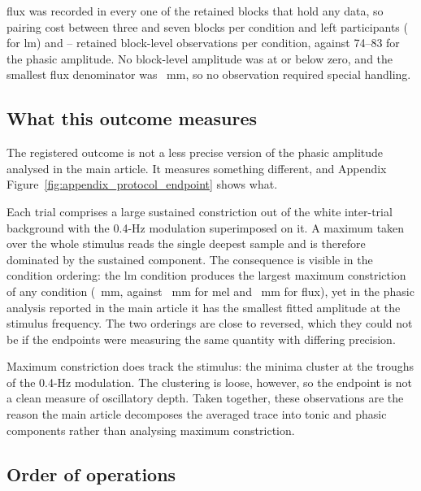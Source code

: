 \begin{appendixbox}
\acs{flux} was recorded in every one of the \ProtocolPlrAllNBlocksAnyData{} retained blocks that hold any data, so pairing cost between three and seven blocks per condition and left \ProtocolPlrAllNParticipantsMax{} participants (\ProtocolPlrAllNParticipantsMin{} for \acs{lm}) and \ProtocolPlrAllNObsMin{}--\ProtocolPlrAllNObsMax{} retained block-level observations per condition, against 74--83 for the phasic amplitude. No block-level amplitude was at or below zero, and the smallest \acs{flux} denominator was \ProtocolPlrAllFluxDenominatorMinMm{}~mm, so no observation required special handling.

\subsection{What this outcome measures}

The registered outcome is not a less precise version of the phasic amplitude analysed in the main article. It measures something different, and Appendix Figure~\ref{fig:appendix_protocol_endpoint} shows what.

Each trial comprises a large sustained constriction out of the white inter-trial background with the 0.4-Hz modulation superimposed on it. A maximum taken over the whole stimulus reads the single deepest sample and is therefore dominated by the sustained component. The consequence is visible in the condition ordering: the \acs{lm} condition produces the largest maximum constriction of any condition (\ProtocolPlrLMEndpointMm{}~mm, against \ProtocolPlrMelEndpointMm{}~mm for \acs{mel} and \ProtocolPlrFluxEndpointMm{}~mm for \acs{flux}), yet in the phasic analysis reported in the main article it has the smallest fitted amplitude at the stimulus frequency. The two orderings are close to reversed, which they could not be if the endpoints were measuring the same quantity with differing precision.

Maximum constriction does track the stimulus: the minima cluster at the troughs of the 0.4-Hz modulation. The clustering is loose, however, so the endpoint is not a clean measure of oscillatory depth. Taken together, these observations are the reason the main article decomposes the averaged trace into tonic and phasic components rather than analysing maximum constriction.

\subsection{Order of operations}


\end{appendixbox}
